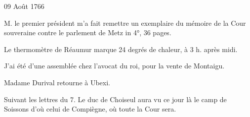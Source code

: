                      \begin{diary}{09 Août 1766}{}
                        
                        
                           M. le premier président m'a fait remettre un
                           exemplaire du mémoire de la Cour souveraine contre
                              le parlement de Metz
                              in 4°, 36 pages. \bigskip
        
        
                         Le thermomètre de Réaumur marque
                              24 degrés
                              de chaleur, à 3 h. après midi. \bigskip
        
        
                         J'ai été d'une assemblée chez
                           l'avocat du roi,
                           pour la vente de Montaigu. \bigskip
        
        
                        
                           Madame Durival retourne à Ubexi. \bigskip
        
        
                        
                           Suivant les lettres du 7.
                           Le duc de Choiseul
                           aura vu ce jour là le camp de
                              Soissons
                           d'où celui de Compiègne,
                           où toute la Cour sera. \bigskip
        
        
                     \end{diary}
                     
                     

